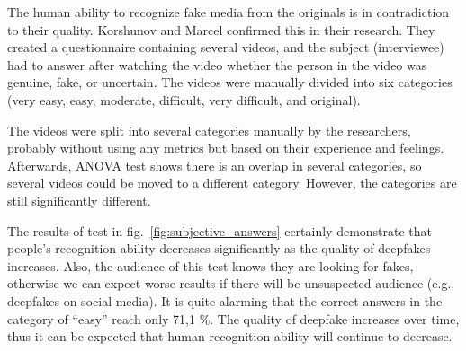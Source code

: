 The human ability to recognize fake media from the originals is in contradiction to their quality. Korshunov and Marcel \cite{TheThreatOfDeepfakes} confirmed this in their research. They created a questionnaire containing several videos, and the subject (interviewee) had to answer after watching the video whether the person in the video was genuine, fake, or uncertain. The videos were manually divided into six categories (very easy, easy, moderate, difficult, very difficult, and original). 

The videos were split into several categories manually by the researchers, probably without using any metrics but based on their experience and feelings. Afterwards, ANOVA test shows there is an overlap in several categories, so several videos could be moved to a different category. However, the categories are still significantly different.

The results of test in fig.~\ref{fig:subjective_answers} certainly demonstrate that people's recognition ability decreases significantly as the quality of deepfakes increases. Also, the audience of this test knows they are looking for fakes, otherwise we can expect worse results if there will be unsuspected audience (e.g., deepfakes on social media). It is quite alarming that the correct answers in the category of “easy” reach only 71,1 \%. The quality of deepfake increases over time, thus it can be expected that human recognition ability will continue to decrease. \cite{TheThreatOfDeepfakes}

